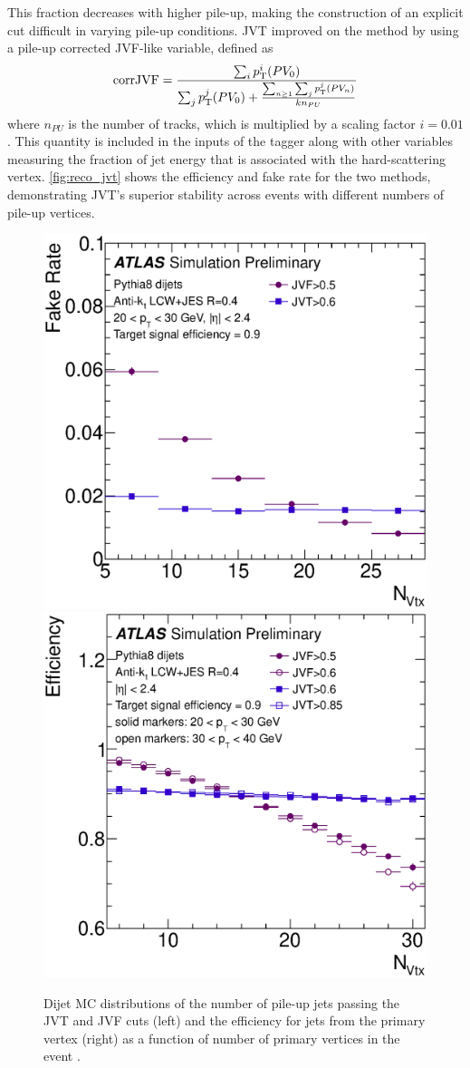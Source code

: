 This fraction decreases with higher pile-up, making the construction of an explicit cut difficult in varying pile-up conditions. \ac{JVT} improved on the method by using a pile-up corrected \ac{JVF}-like variable, defined as 
%
\begin{equation}
\mathrm{corrJVF} = \frac{\sum_i p_{\text{T}}^i(PV_0)}{\sum_j p_{\text{T}}^j(PV_0) + \frac{\sum_{n\geq1} \sum_j p_{\text{T}}^j(PV_n)}{kn_{PU}}} 
\end{equation}
%
where $n_{PU}$ is the number of tracks, which is multiplied by a scaling factor $i = 0.01$. This quantity is included in the inputs of the tagger along with other variables measuring the fraction of jet energy that is associated with the hard-scattering vertex. \autoref{fig:reco_jvt} shows the efficiency and fake rate for the two methods, demonstrating \ac{JVT}'s superior stability across events with different numbers of pile-up vertices. 

\begin{centering}
\begin{figure}[!hbt]
\myfloatalign
\includegraphics[width=.48\linewidth]{figures/reco/jvt_fig_06b.eps}
\includegraphics[width=.48\linewidth]{figures/reco/jvt_fig_07a.eps}
\caption{ Dijet \ac{MC} distributions of the number of pile-up jets passing the \ac{JVT} and \ac{JVF} cuts (left) and the efficiency for jets from the primary vertex (right) as a function of number of primary vertices in the event \cite{ATLAS-CONF-2014-018}. }
\label{fig:reco_jvt}
\end{figure}
\end{centering}

